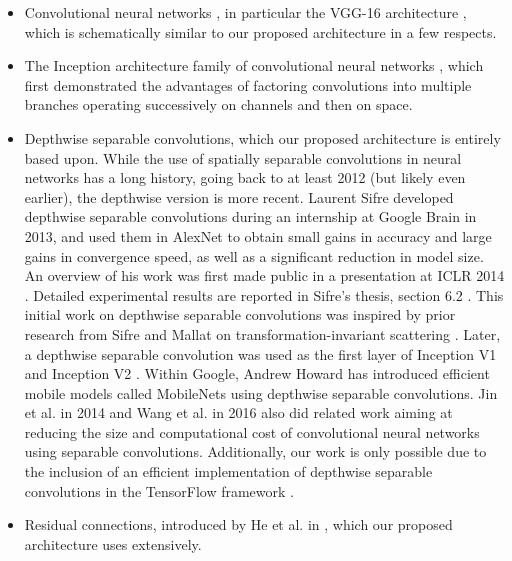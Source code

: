 \documentclass[10pt,twocolumn,letterpaper]{article}
\begin{document}
\begin{itemize}
  \item Convolutional neural networks \cite{lecun1995learning, krizhevsky2012imagenet, zeiler2014visualizing}, in particular the VGG-16 architecture \cite{simonyan2014very}, which is schematically similar to our proposed architecture in a few respects.

  \item The Inception architecture family of convolutional neural networks \cite{szegedy2015going, ioffe2015batch, szegedy2015rethinking, inceptionResnet}, which first demonstrated the advantages of factoring convolutions into multiple branches operating successively on channels and then on space.

  \item Depthwise separable convolutions, which our proposed architecture is entirely based upon. While the use of spatially separable convolutions in neural networks has a long history, going back to at least 2012 \cite{mamalet12} (but likely even earlier), the depthwise version is more recent. Laurent Sifre developed depthwise separable convolutions during an internship at Google Brain in 2013, and used them in AlexNet to obtain small gains in accuracy and large gains in convergence speed, as well as a significant reduction in model size. An overview of his work was first made public in a presentation at ICLR 2014 \cite{vanhoucke-iclr14}. Detailed experimental results are reported in Sifre's thesis, section 6.2 \cite{sifre14}. This initial work on depthwise separable convolutions was inspired by prior research from Sifre and Mallat on transformation-invariant scattering \cite{sifre2013, sifre14}. Later, a depthwise separable convolution was used as the first layer of Inception V1 and Inception V2 \cite{szegedy2015going, ioffe2015batch}. Within Google, Andrew Howard \cite{Howard16} has introduced efficient mobile models called MobileNets using depthwise separable convolutions. Jin et al. in 2014 \cite{JinDC14} and Wang et al. in 2016 \cite{WangLF16b} also did related work aiming at reducing the size and computational cost of convolutional neural networks using separable convolutions. Additionally, our work is only possible due to the inclusion of an efficient implementation of depthwise separable convolutions in the TensorFlow framework \cite{tensorflow2015-whitepaper}.

  \item Residual connections, introduced by He et al. in \cite{he2015deep}, which our proposed architecture uses extensively.
\end{itemize}
\end{document}
